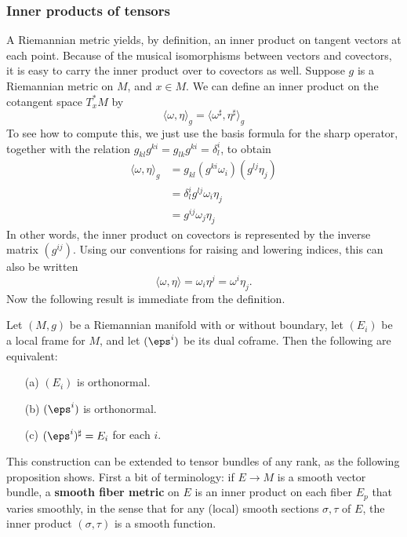 \subsubsection{Inner products of tensors}
A Riemannian metric yields, by definition, an inner product on tangent 
vectors at each point. Because of the musical isomorphisms between vectors 
and covectors, it is easy to carry the inner product over to covectors as 
well. Suppose $g$ is a Riemannian metric on $M$, and $x\in M$. We can define 
an inner product on the cotangent space $T^*_xM$ by
\[\langle\omega,\eta\rangle_g=\langle\omega^\sharp,\eta^{\sharp}\rangle_g\]
To see how to compute this, we just use the basis formula for the sharp operator, 
together with the relation $g_{kl}g^{ki}=g_{lk}g^{ki}=\delta_l^i$, to obtain
\begin{align*}
\langle\omega,\eta\rangle_g&=g_{kl}(g^{ki}\omega_i)(g^{lj}\eta_j)\\
&=\delta^i_lg^{lj}\omega_i\eta_j\\
&=g^{ij}\omega_j\eta_j
\end{align*}
In other words, the inner product on covectors is represented by the 
inverse matrix $(g^{ij})$. Using our conventions for raising and lowering 
indices, this can also be written
\[\langle\omega,\eta\rangle=\omega_i\eta^j=\omega^i\eta_j.\]
Now the following result is immediate from the definition.
\begin{proposition}
Let $(M,g)$ be a Riemannian manifold with or without boundary, let $(E_i)$ 
be a local frame for $M$, and let $(\eps^i)$ be its dual coframe. Then the 
following are equivalent:
\begin{itemize}
\item[(a)] $(E_i)$ is orthonormal.
\item[(b)] $(\eps^i)$ is orthonormal.
\item[(c)] $(\eps^i)^{\sharp}=E_i$ for each $i$. 
\end{itemize}
\end{proposition}
This construction can be extended to tensor bundles of any rank, as the 
following proposition shows. First a bit of terminology: if $E\to M$ is a 
smooth vector bundle, a \textbf{smooth fiber metric} on $E$ is an inner 
product on each fiber $E_p$ that varies smoothly, in the sense that for any 
(local) smooth sections $\sigma,\tau$ of $E$, the inner product $(\sigma,\tau)$ 
is a smooth function.
